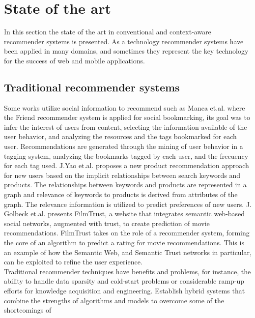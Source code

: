 \chapter{State of the art} \label{stateoftheart}

In this section the state of the art in conventional and
context-aware recommender systems is presented. 
As a technology recommender systems have been applied 
in many domains, and sometimes they represent the  key
technology for the success of web and mobile applications.

\section{Traditional recommender systems} 
Some works utilize social information to recommend such
as Manca et.al. \cite{manca2014mining} where the Friend recommender
system is applied for social bookmarking, its goal was to
infer the interest of users from content, selecting the 
information available of the user behavior, and analyzing the resources and the
tags bookmarked for each user. Recommendations are generated
through the mining of user behavior in a tagging system, analyzing the
bookmarks tagged by each user, and the frecuency for each tag used. 
J.Yao et.al. \cite{yao2012product} proposes a new product recommendation
approach for new users based on the implicit relationships between
search keywords and products. The relationships between keywords and
products are represented in a graph and relevance of keywords to
products is derived from attributes of the graph.
The relevance
information is utilized to predict preferences of new users. J.
Golbeck et.al. \cite{golbeck2006filmtrust} presents FilmTrust, a
website that integrates semantic web-based social networks, augmented
with trust, to create prediction of movie recommendations. FilmTrust takes on
the role of a recommender system, forming the core of an algorithm to
predict a rating for movie recommendations. This is an example of
how the Semantic Web, and Semantic Trust networks in particular, can
be exploited to refine the user experience. \\  
Traditional recommender techniques have benefits and problems, for
instance, the ability to handle data sparsity and cold-start problems
or considerable ramp-up efforts for knowledge acquisition and
engineering. Establish hybrid systems that combine the strengths of
algorithms and models to overcome some of the shortcomings of
